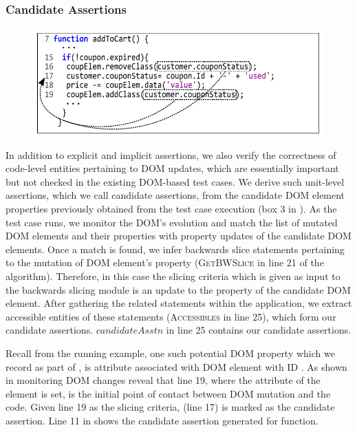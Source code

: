\subsubsection{Candidate Assertions} \label{Sec:candidateAssertions}
\begin{figure}[!t]
  \centering
  \includegraphics[width=0.8\hsize]{fig/candidateDOMToCode}
  \vspace{0.2in} 
  \label{Fig:candidateDOMToCode}
\end{figure}
In addition to explicit and implicit assertions, we also verify the correctness of code-level entities pertaining to DOM updates, which are essentially important but not checked in the existing DOM-based test cases. We derive such unit-level assertions, which we call candidate assertions, from the candidate DOM element properties previously obtained from the test case execution (box 3 in ). As the test case runs, we monitor the DOM's evolution and match the list of mutated DOM elements and their properties with property updates of the candidate DOM elements. Once a match is found, we infer backwards slice statements pertaining to the mutation of DOM element's property (\textsc{GetBWSlice} in line 21 of the algorithm). Therefore, in this case the slicing criteria which is given as input to the backwards slicing module is an update to the property of the candidate DOM element.
After gathering the related \javascript statements within the application, we extract accessible entities of these statements (\textsc{Accessibles} in line 25), which form our candidate assertions. $candidateAsstn$ in line 25 contains our candidate assertions. 

Recall from the running example, one such potential DOM property which we record as part of , is  attribute associated with DOM element with ID . As shown in  monitoring DOM changes reveal that line 19, where the  attribute of the element is set, is the initial point of contact between DOM mutation and the \javascript code. Given line 19 as the slicing criteria,  (line 17) is marked as the candidate assertion.
Line 11 in  shows the candidate assertion generated for  function. 